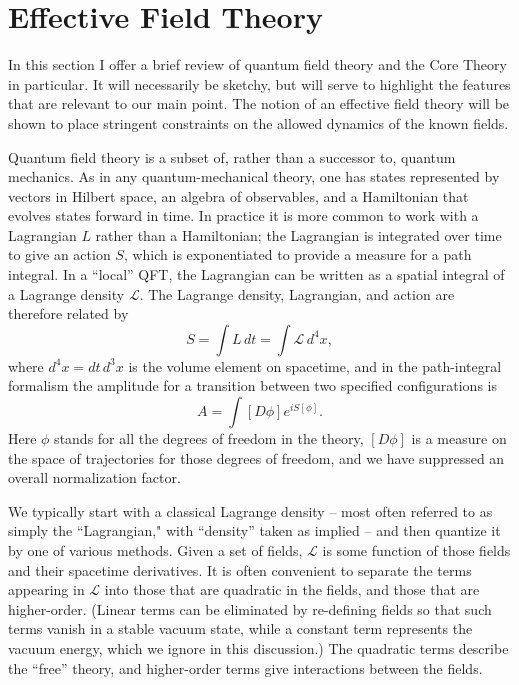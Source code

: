\documentclass[12pt,letterpaper]{article}
\newcommand{\be}{\begin{equation}}
\newcommand{\ee}{\end{equation}}
\newcommand{\lag}{{\mathcal L}}
\begin{document}
\section{Effective Field Theory}

In this section I offer a brief review of quantum field theory and the Core Theory in particular.
It will necessarily be sketchy, but will serve to highlight the features that are relevant to our main point.
The notion of an effective field theory will be shown to place stringent constraints on the allowed dynamics of the known fields.

Quantum field theory is a subset of, rather than a successor to, quantum mechanics.
As in any quantum-mechanical theory, one has states represented by vectors in Hilbert space, an algebra of observables, and a Hamiltonian that evolves states forward in time.
In practice it is more common to work with a Lagrangian $L$ rather than a Hamiltonian; the Lagrangian is integrated over time to give an action $S$, which is exponentiated to provide a measure for a path integral.
In a ``local'' QFT, the Lagrangian can be written as a spatial integral of a Lagrange density $\lag$.
The Lagrange density, Lagrangian, and action are therefore related by
\be
  S = \int L\,dt = \int \lag \, d^4x,
  \label{action}
\ee
where $d^4x = dt\, d^3x$ is the volume element on spacetime, and in the path-integral formalism the amplitude for a transition between two specified configurations is
\be
A = \int [D\phi] e^{iS[\phi]}.
\label{pathintegral}
\ee
Here $\phi$ stands for all the degrees of freedom in the theory, $[D\phi]$ is a measure on the space of trajectories for those degrees of freedom, and we have suppressed an overall normalization factor.

We typically start with a classical Lagrange density -- most often referred to as simply the ``Lagrangian," with ``density'' taken as implied -- and then quantize it by one of various methods.
Given a set of fields, $\lag$ is some function of those fields and their spacetime derivatives.
It is often convenient to separate the terms appearing in $\lag$ into those that are quadratic in the fields, and those that are higher-order.
(Linear terms can be eliminated by re-defining fields so that such terms vanish in a stable vacuum state, while a constant term represents the vacuum energy, which we ignore in this discussion.)
The quadratic terms describe the ``free'' theory, and higher-order terms give interactions between the fields.
\end{document}
